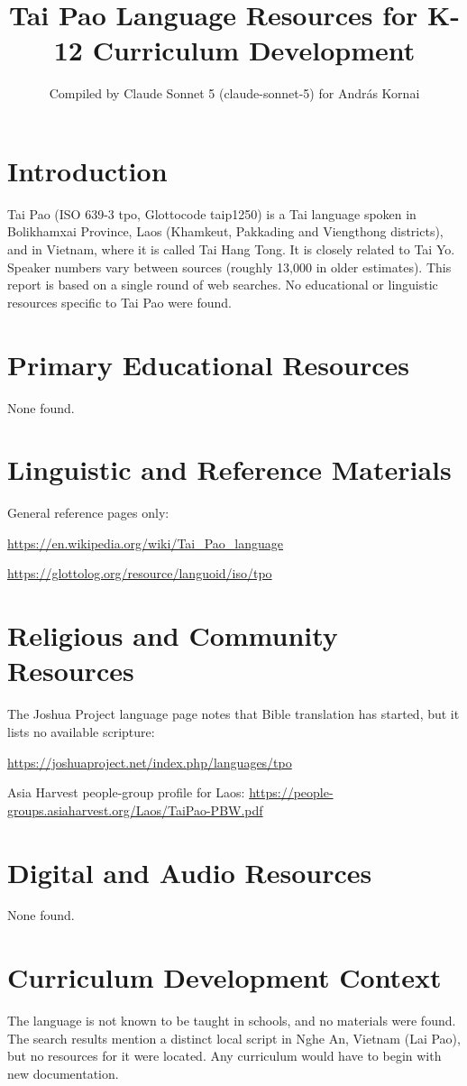 \documentclass[12pt]{article}
\title{Tai Pao Language Resources for K-12 Curriculum Development}
\author{Compiled by Claude Sonnet 5 (claude-sonnet-5) for Andr\'as Kornai}
\date{}
\begin{document}
\maketitle
\section{Introduction}
Tai Pao (ISO 639-3 tpo, Glottocode taip1250) is a Tai language spoken in Bolikhamxai Province, Laos (Khamkeut, Pakkading and Viengthong districts), and in Vietnam, where it is called Tai Hang Tong. It is closely related to Tai Yo. Speaker numbers vary between sources (roughly 13,000 in older estimates). This report is based on a single round of web searches. No educational or linguistic resources specific to Tai Pao were found.
\section{Primary Educational Resources}
None found.
\section{Linguistic and Reference Materials}
General reference pages only:

\url{https://en.wikipedia.org/wiki/Tai_Pao_language}

\url{https://glottolog.org/resource/languoid/iso/tpo}
\section{Religious and Community Resources}
The Joshua Project language page notes that Bible translation has started, but it lists no available scripture:

\url{https://joshuaproject.net/index.php/languages/tpo}

Asia Harvest people-group profile for Laos: \url{https://people-groups.asiaharvest.org/Laos/TaiPao-PBW.pdf}
\section{Digital and Audio Resources}
None found.
\section{Curriculum Development Context}
The language is not known to be taught in schools, and no materials were found. The search results mention a distinct local script in Nghe An, Vietnam (Lai Pao), but no resources for it were located. Any curriculum would have to begin with new documentation.
\end{document}
